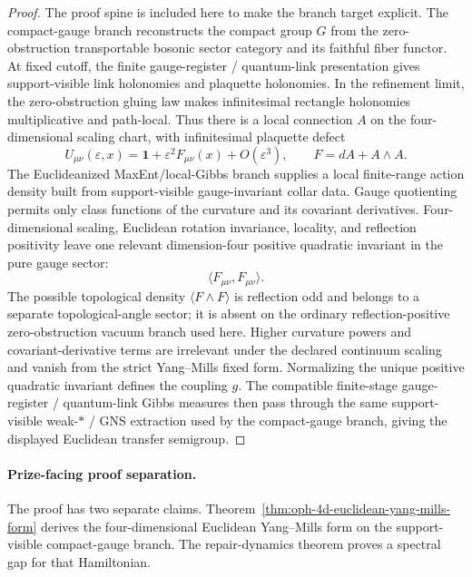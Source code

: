 \begin{proof}
The proof spine is included here to make the branch target explicit.
The compact-gauge branch reconstructs the compact group \(G\) from the zero-obstruction
transportable bosonic sector category and its faithful fiber functor. At fixed cutoff, the finite
gauge-register / quantum-link presentation gives support-visible link holonomies and plaquette
holonomies. In the refinement limit, the zero-obstruction gluing law makes infinitesimal
rectangle holonomies multiplicative and path-local. Thus there is a local connection \(A\) on the
four-dimensional scaling chart, with infinitesimal plaquette defect
\[
U_{\mu\nu}(\varepsilon,x)
=
\mathbf 1+\varepsilon^2F_{\mu\nu}(x)+O(\varepsilon^3),
\qquad
F=dA+A\wedge A.
\]
The Euclideanized MaxEnt/local-Gibbs branch supplies a local finite-range action density built
from support-visible gauge-invariant collar data. Gauge quotienting permits only class functions
of the curvature and its covariant derivatives. Four-dimensional scaling, Euclidean rotation
invariance, locality, and reflection positivity leave one relevant dimension-four positive
quadratic invariant in the pure gauge sector:
\[
\langle F_{\mu\nu},F_{\mu\nu}\rangle.
\]
The possible topological density \(\langle F\wedge F\rangle\) is reflection odd and belongs to a
separate topological-angle sector; it is absent on the ordinary reflection-positive
zero-obstruction vacuum branch used here. Higher curvature powers and covariant-derivative terms
are irrelevant under the declared continuum scaling and vanish from the strict Yang--Mills fixed
form. Normalizing the unique positive quadratic invariant defines the coupling \(g\). The
compatible finite-stage gauge-register / quantum-link Gibbs measures then pass through the same
support-visible weak-\(*\) / GNS extraction used by the compact-gauge branch, giving the displayed
Euclidean transfer semigroup.
\end{proof}

\paragraph{Prize-facing proof separation.}
The proof has two separate claims. Theorem~\ref{thm:oph-4d-euclidean-yang-mills-form} derives the
four-dimensional Euclidean Yang--Mills form on the support-visible compact-gauge branch. The
repair-dynamics theorem proves a spectral gap for that Hamiltonian.

